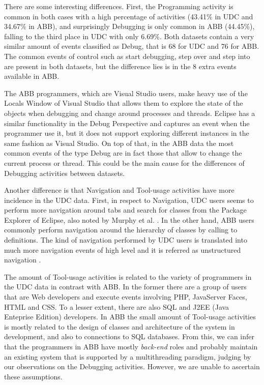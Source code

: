 There are some interesting differences. First, the Programming activity is common in both cases with a high percentage of activities (43.41\% in UDC and 34.67\% in ABB), and surprisingly Debugging is only common in ABB (44.45\%), falling to the third place in UDC with only 6.69\%. Both datasets contain a very similar amount of events classified as Debug, that is 68 for UDC and 76 for ABB. The common events of control such as start debugging, step over and step into are present in both datasets, but the difference lies is in the 8 extra events available in ABB. 

The ABB programmers, which are Visual Studio users, make heavy use of the Locals Window of Visual Studio that allows them to explore the state of the objects when debugging and change around processes and threads. Eclipse has a similar functionality in the Debug Perspective and captures an event when the programmer use it, but it does not support exploring different instances in the same fashion as Visual Studio. On top of that, in the ABB data the most common events of the type Debug are in fact those that allow to change the current process or thread. This could be the main cause for the differences of Debugging activities between datasets.

Another difference is that Navigation and Tool-usage activities have more incidence in the UDC data. First, in respect to Navigation, UDC users seems to perform more navigation around tabs and search for classes from the Package Explorer of Eclipse, also noted by Murphy et al. \cite{MKF06}. In the other hand, ABB users commonly perform navigation around the hierarchy of classes by calling to definitions. The kind of navigation performed by UDC users is translated into much more navigation events of high level and it is referred as unstructured navigation \cite{AFQ15}.

The amount of Tool-usage activities is related to the variety of programmers in the UDC data in contrast with ABB. In the former there are a group of users that are Web developers and execute events involving PHP, JavaServer Faces, HTML and CSS. To a lesser extent, there are also SQL and J2EE (Java Enteprise Edition) developers. In ABB the small amount of Tool-usage activities is mostly related to the design of classes and architecture of the system in development, and also to connections to SQL databases. From this, we can infer that the programmers in ABB have mostly \emph{back-end} roles and probably maintain an existing system that is supported by a multithreading paradigm, judging by our observations on the Debugging activities. However, we are unable to ascertain these assumptions.

